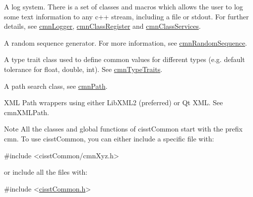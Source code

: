 \begin{DoxyItemize}
\item A log system. There is a set of classes and macros which allows the user to log some text information to any c++ stream, including a file or stdout. For further details, see \hyperlink{classcmn_logger}{cmn\-Logger}, \hyperlink{classcmn_class_register}{cmn\-Class\-Register} and \hyperlink{classcmn_class_services}{cmn\-Class\-Services}.
\item A random sequence generator. For more information, see \hyperlink{classcmn_random_sequence}{cmn\-Random\-Sequence}.
\item A type trait class used to define common values for different types (e.\-g. default tolerance for float, double, int). See \hyperlink{classcmn_type_traits}{cmn\-Type\-Traits}.
\item A path search class, see \hyperlink{classcmn_path}{cmn\-Path}.
\item X\-M\-L Path wrappers using either Lib\-X\-M\-L2 (preferred) or Qt X\-M\-L. See cmn\-X\-M\-L\-Path.
\end{DoxyItemize}

\begin{DoxyNote}{Note}
All the classes and global functions of cisst\-Common start with the prefix cmn. To use cisst\-Common, you can either include a specific file with\-: 
\begin{DoxyCode}
\textcolor{preprocessor}{#include <cisstCommon/cmnXyz.h>}
\end{DoxyCode}
 or include all the files with\-: 
\begin{DoxyCode}
\textcolor{preprocessor}{#include <\hyperlink{cisst_common_8h}{cisstCommon.h}>}
\end{DoxyCode}
 
\end{DoxyNote}


